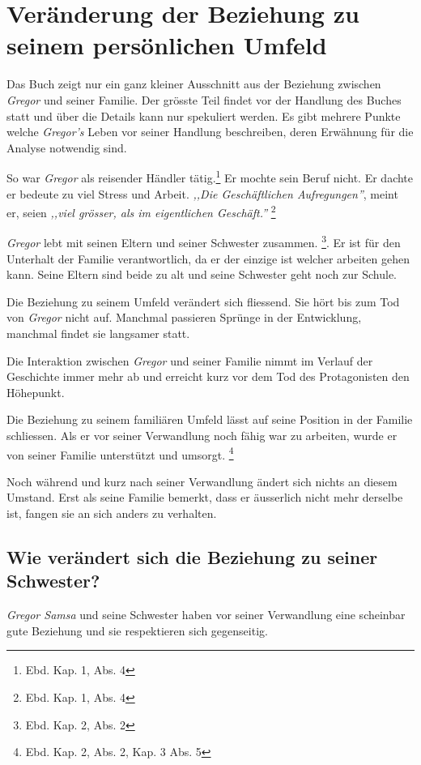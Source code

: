 \documentclass[12pt,a4paper,twoside,titlepage]{article}
\let\oldsection\section
\renewcommand\section{\clearpage\oldsection}
\begin{document}
	
	
	\section{Veränderung der Beziehung zu seinem persönlichen Umfeld}
	Das Buch zeigt nur ein ganz kleiner Ausschnitt aus der Beziehung zwischen \textit{Gregor} und seiner Familie. Der grösste Teil findet vor der Handlung des Buches statt und über die Details kann nur spekuliert werden. Es gibt mehrere Punkte welche \textit{Gregor's} Leben vor seiner Handlung beschreiben, deren Erwähnung für die Analyse notwendig sind.
	
	So war \textit{Gregor} als reisender Händler tätig.\footnote{Ebd. Kap. 1, Abs. 4} Er mochte sein Beruf nicht. Er dachte er bedeute zu viel Stress und Arbeit. \textit{,,Die Geschäftlichen Aufregungen''}, meint er, seien \textit{,,viel grösser, als im eigentlichen Geschäft.''} \footnote{Ebd. Kap. 1, Abs. 4}
	
	\textit{Gregor} lebt mit seinen Eltern und seiner Schwester zusammen. \footnote{Ebd. Kap. 2, Abs. 2}. Er ist für den Unterhalt der Familie verantwortlich, da er der einzige ist welcher arbeiten gehen kann. Seine Eltern sind beide zu alt und seine Schwester geht noch zur Schule.
	
	Die Beziehung zu seinem Umfeld verändert sich fliessend. Sie hört bis zum Tod von \textit{Gregor} nicht auf. Manchmal passieren Sprünge in der Entwicklung, manchmal findet sie langsamer statt. 
	
	
	Die Interaktion zwischen \textit{Gregor} und seiner Familie nimmt im Verlauf der Geschichte immer mehr ab und erreicht kurz vor dem Tod des Protagonisten den Höhepunkt.

	Die Beziehung zu seinem familiären Umfeld lässt auf seine Position in der Familie schliessen. Als er vor seiner Verwandlung noch fähig war zu arbeiten, wurde er von seiner Familie unterstützt und umsorgt. \footnote{Ebd. Kap. 2, Abs. 2, Kap. 3 Abs. 5}

	Noch während und kurz nach seiner Verwandlung ändert sich nichts an diesem Umstand. Erst als seine Familie bemerkt, dass er äusserlich nicht mehr derselbe ist, fangen sie an sich anders zu verhalten.
	
	\subsection{Wie verändert sich die Beziehung zu seiner Schwester?}
	
	\textit{Gregor Samsa} und seine Schwester haben vor seiner Verwandlung eine scheinbar gute Beziehung und sie respektieren sich gegenseitig. 
	
\end{document}
